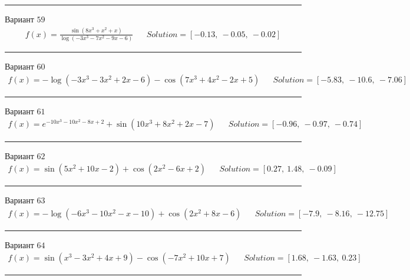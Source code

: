\documentclass[11pt]{report}
\begin{document}
\begin{center}
    \noindent\rule{8cm}{0.4pt}
\end{center}
Вариант \(59\)
\begin{align*}
    f(x) = \frac{\sin{\left(8 x^{3} + x^{2} + x \right)}}{\log{\left(- 3 x^{3} - 7 x^{2} - 9 x - 6 \right)}} && Solution = \left[ -0.13, \  -0.05, \  -0.02\right]
\end{align*}
\begin{center}
    \noindent\rule{8cm}{0.4pt}
\end{center}
Вариант \(60\)
\begin{align*}
    f(x) = - \log{\left(- 3 x^{3} - 3 x^{2} + 2 x - 6 \right)} - \cos{\left(7 x^{3} + 4 x^{2} - 2 x + 5 \right)} && Solution = \left[ -5.83, \  -10.6, \  -7.06\right]
\end{align*}
\begin{center}
    \noindent\rule{8cm}{0.4pt}
\end{center}
Вариант \(61\)
\begin{align*}
    f(x) = e^{- 10 x^{3} - 10 x^{2} - 8 x + 2} + \sin{\left(10 x^{3} + 8 x^{2} + 2 x - 7 \right)} && Solution = \left[ -0.96, \  -0.97, \  -0.74\right]
\end{align*}
\begin{center}
    \noindent\rule{8cm}{0.4pt}
\end{center}
Вариант \(62\)
\begin{align*}
    f(x) = \sin{\left(5 x^{2} + 10 x - 2 \right)} + \cos{\left(2 x^{2} - 6 x + 2 \right)} && Solution = \left[ 0.27, \  1.48, \  -0.09\right]
\end{align*}
\begin{center}
    \noindent\rule{8cm}{0.4pt}
\end{center}
Вариант \(63\)
\begin{align*}
    f(x) = - \log{\left(- 6 x^{3} - 10 x^{2} - x - 10 \right)} + \cos{\left(2 x^{2} + 8 x - 6 \right)} && Solution = \left[ -7.9, \  -8.16, \  -12.75\right]
\end{align*}
\begin{center}
    \noindent\rule{8cm}{0.4pt}
\end{center}
Вариант \(64\)
\begin{align*}
    f(x) = \sin{\left(x^{3} - 3 x^{2} + 4 x + 9 \right)} - \cos{\left(- 7 x^{2} + 10 x + 7 \right)} && Solution = \left[ 1.68, \  -1.63, \  0.23\right]
\end{align*}
\begin{center}
    \noindent\rule{8cm}{0.4pt}
\end{center}
\end{document}
